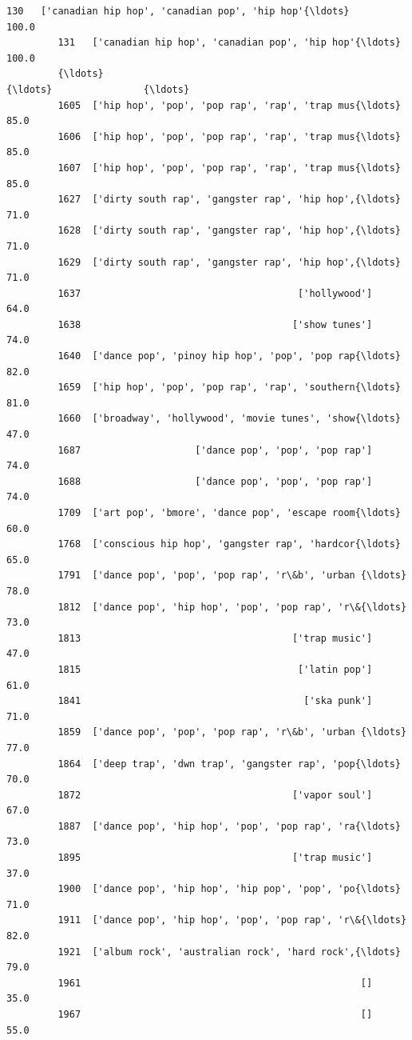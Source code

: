 \documentclass[11pt]{article}
\begin{document}
\begin{Verbatim}[commandchars=\\\{\}]
         130   ['canadian hip hop', 'canadian pop', 'hip hop'{\ldots}              100.0   
         131   ['canadian hip hop', 'canadian pop', 'hip hop'{\ldots}              100.0   
         {\ldots}                                                 {\ldots}                {\ldots}   
         1605  ['hip hop', 'pop', 'pop rap', 'rap', 'trap mus{\ldots}               85.0   
         1606  ['hip hop', 'pop', 'pop rap', 'rap', 'trap mus{\ldots}               85.0   
         1607  ['hip hop', 'pop', 'pop rap', 'rap', 'trap mus{\ldots}               85.0   
         1627  ['dirty south rap', 'gangster rap', 'hip hop',{\ldots}               71.0   
         1628  ['dirty south rap', 'gangster rap', 'hip hop',{\ldots}               71.0   
         1629  ['dirty south rap', 'gangster rap', 'hip hop',{\ldots}               71.0   
         1637                                      ['hollywood']               64.0   
         1638                                     ['show tunes']               74.0   
         1640  ['dance pop', 'pinoy hip hop', 'pop', 'pop rap{\ldots}               82.0   
         1659  ['hip hop', 'pop', 'pop rap', 'rap', 'southern{\ldots}               81.0   
         1660  ['broadway', 'hollywood', 'movie tunes', 'show{\ldots}               47.0   
         1687                    ['dance pop', 'pop', 'pop rap']               74.0   
         1688                    ['dance pop', 'pop', 'pop rap']               74.0   
         1709  ['art pop', 'bmore', 'dance pop', 'escape room{\ldots}               60.0   
         1768  ['conscious hip hop', 'gangster rap', 'hardcor{\ldots}               65.0   
         1791  ['dance pop', 'pop', 'pop rap', 'r\&b', 'urban {\ldots}               78.0   
         1812  ['dance pop', 'hip hop', 'pop', 'pop rap', 'r\&{\ldots}               73.0   
         1813                                     ['trap music']               47.0   
         1815                                      ['latin pop']               61.0   
         1841                                       ['ska punk']               71.0   
         1859  ['dance pop', 'pop', 'pop rap', 'r\&b', 'urban {\ldots}               77.0   
         1864  ['deep trap', 'dwn trap', 'gangster rap', 'pop{\ldots}               70.0   
         1872                                     ['vapor soul']               67.0   
         1887  ['dance pop', 'hip hop', 'pop', 'pop rap', 'ra{\ldots}               73.0   
         1895                                     ['trap music']               37.0   
         1900  ['dance pop', 'hip hop', 'hip pop', 'pop', 'po{\ldots}               71.0   
         1911  ['dance pop', 'hip hop', 'pop', 'pop rap', 'r\&{\ldots}               82.0   
         1921  ['album rock', 'australian rock', 'hard rock',{\ldots}               79.0   
         1961                                                 []               35.0   
         1967                                                 []               55.0   
         

\end{Verbatim}
\end{document}

